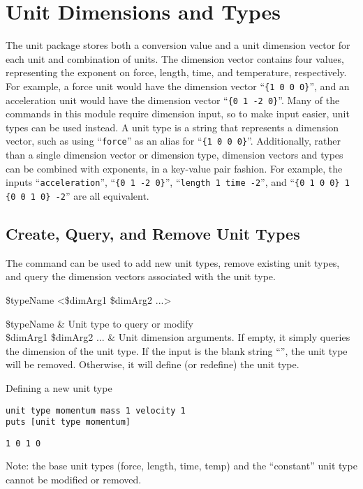 \documentclass{article}
\begin{document}
\clearpage
\section{Unit Dimensions and Types}
The unit package stores both a conversion value and a unit dimension vector for each unit and combination of units.
The dimension vector contains four values, representing the exponent on force, length, time, and temperature, respectively. 
For example, a force unit would have the dimension vector ``\texttt{\{1 0 0 0\}}'', and an acceleration unit would have the dimension vector ``\texttt{\{0 1 -2 0\}}''.
Many of the commands in this module require dimension input, so to make input easier, unit types can be used instead.
A unit type is a string that represents a dimension vector, such as using ``\texttt{force}'' as an alias for ``\texttt{\{1 0 0 0\}}''.
Additionally, rather than a single dimension vector or dimension type, dimension vectors and types can be combined with exponents, in a key-value pair fashion.
For example, the inputs  ``\texttt{acceleration}'', ``\texttt{\{0 1 -2 0\}}'', ``\texttt{length 1 time -2}'', and ``\texttt{\{0 1 0 0\} 1 \{0 0 1 0\} -2}'' are all equivalent.

\subsection{Create, Query, and Remove Unit Types}
The command  can be used to add new unit types, remove existing unit types, and query the dimension vectors associated with the unit type. 
\begin{syntax}
 \$typeName <\$dimArg1 \$dimArg2 ...>
\end{syntax}
\begin{args}
\$typeName & Unit type to query or modify \\
\$dimArg1 \$dimArg2 ... & Unit dimension arguments. 
If empty, it simply queries the dimension of the unit type. 
If the input is the blank string ``'', the unit type will be removed. 
Otherwise, it will define (or redefine) the unit type.
\end{args}

\begin{example}{Defining a new unit type}
\begin{lstlisting}
unit type momentum mass 1 velocity 1
puts [unit type momentum]
\end{lstlisting}
\tcblower
\begin{lstlisting}
1 0 1 0
\end{lstlisting}
\end{example}
Note: the base unit types (force, length, time, temp) and the ``constant'' unit type cannot be modified or removed. 
\clearpage
\end{document}
